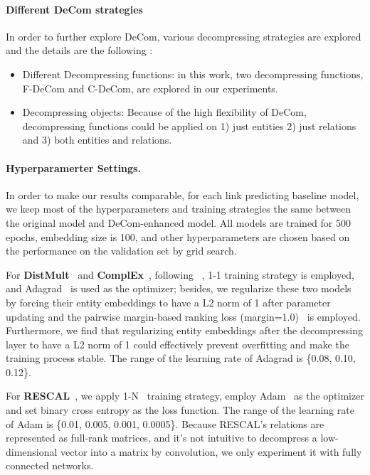 \documentclass[letterpaper]{article} \usepackage{aaai20}  \usepackage{times}  \usepackage{helvet} \usepackage{courier}  \usepackage{booktabs}
\begin{document}
\paragraph{Different DeCom strategies}
In order to further explore DeCom, various decompressing strategies are explored and the details are the following :
\begin{itemize}
    \item Different Decompressing functions: in this work, two decompressing functions, F-DeCom and C-DeCom, are explored in our experiments.
    \item Decompressing objects: Because of the high flexibility of DeCom, decompressing functions could be applied on 1) just entities 2) just relations and 3) both entities and relations.
\end{itemize}
\paragraph{Hyperparamerter Settings.}
In order to make our results comparable, for each link predicting baseline model, we keep most of the hyperparameters and training strategies the same between the original model and DeCom-enhanced model. All models are trained for 500 epochs, embedding size is 100, and other hyperparameters are chosen based on the performance on the validation set by grid search.

For \textbf{DistMult}~\cite{yang2014embedding} and \textbf{ComplEx}~\cite{trouillon2016complex}, following \citeauthor{dettmers2018convolutional}~, 1-1 training strategy is employed, and Adagrad~\cite{duchi2011adaptive} is used as the optimizer; besides, we regularize these two models by forcing their entity embeddings to have a L2 norm of 1 after parameter updating and the pairwise margin-based ranking loss (margin=1.0)~\cite{bordes2013translating} is employed. Furthermore, we find that regularizing entity embeddings after the decompressing layer to have a L2 norm of 1 could effectively prevent overfitting and make the training process stable. The range of the learning rate of Adagrad is \{0.08, 0.10, 0.12\}.


For \textbf{RESCAL}~\cite{nickel2011three}, we apply 1-N~\cite{dettmers2018convolutional} training strategy, employ Adam~\cite{kingma2014adam} as the optimizer and set binary cross entropy as the loss function. The range of the learning rate of Adam is \{0.01, 0.005, 0.001, 0.0005\}. Because RESCAL's relations are represented as full-rank matrices, and it's not intuitive to decompress a low-dimensional vector into a matrix by convolution, we only experiment it with fully connected networks.
\end{document}
